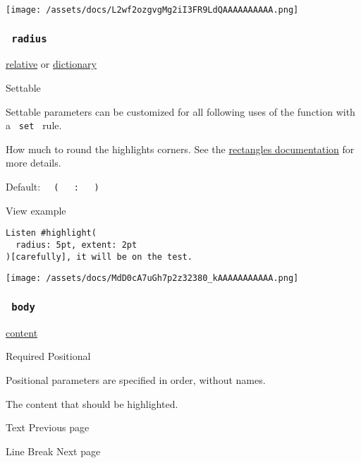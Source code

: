 \texttt{[image: /assets/docs/L2wf2ozgvgMg2iI3FR9LdQAAAAAAAAAA.png]}

\subsubsection{\texorpdfstring{\texttt{\ radius\ }}{ radius }}\label{parameters-radius}

\href{/docs/reference/layout/relative/}{relative} {or}
\href{/docs/reference/foundations/dictionary/}{dictionary}

{{ Settable }}

\label{parameters-radius-settable-tooltip}
Settable parameters can be customized for all following uses of the
function with a \texttt{\ set\ } rule.

How much to round the highlight\textquotesingle s corners. See the
\href{/docs/reference/visualize/rect/\#parameters-radius}{rectangle\textquotesingle s
documentation} for more details.

Default:
\texttt{\ }{\texttt{\ (\ }}\texttt{\ }{\texttt{\ :\ }}\texttt{\ }{\texttt{\ )\ }}\texttt{\ }


View example

\begin{verbatim}
Listen #highlight(
  radius: 5pt, extent: 2pt
)[carefully], it will be on the test.
\end{verbatim}

\texttt{[image: /assets/docs/MdD0cA7uGh7p2z32380\_kAAAAAAAAAAA.png]}

\subsubsection{\texorpdfstring{\texttt{\ body\ }}{ body }}\label{parameters-body}

\href{/docs/reference/foundations/content/}{content}

{Required} {{ Positional }}

\label{parameters-body-positional-tooltip}
Positional parameters are specified in order, without names.

The content that should be highlighted.

\href{/docs/reference/text/}{\pandocbounded{}}

{ Text } { Previous page }

\href{/docs/reference/text/linebreak/}{\pandocbounded{}}

{ Line Break } { Next page }
